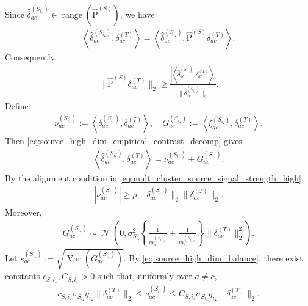 \documentclass[10pt]{article}
\newcommand{\wh}{\widehat}
\DeclareMathOperator{\dnorm}{\mathcal N}
\newcommand{\trg}{T}
\newcommand{\src}{S}
\newcommand{\sigmaSm}[1]{\sigma_{\src_{#1}}}
\newcommand{\Pest}{\wh{\mathrm P}}
\begin{document}
Since $\widehat\delta_{ac}^{(\src_{i_\star})}\in\operatorname{range}(\Pest^{(\src)})$, we have
\begin{align}
    \left\langle\widehat\delta_{ac}^{(\src_{i_\star})},\delta_{ac}^{(\trg)}\right\rangle=\left\langle\widehat\delta_{ac}^{(\src_{i_\star})},\Pest^{(\src)}\delta_{ac}^{(\trg)}\right\rangle.
\end{align}
Consequently,
\begin{align}
\label{eq:source_high_dim_projection_lower_bound_raw}
    \|\Pest^{(\src)}\delta_{ac}^{(\trg)}\|_2\ge \frac{\left|\left\langle\widehat\delta_{ac}^{(\src_{i_\star})},\delta_{ac}^{(\trg)}\right\rangle\right|}{\|\widehat\delta_{ac}^{(\src_{i_\star})}\|_2}.
\end{align}
Define
\begin{align}
\label{eq:source_high_dim_scalar_defs}
    \nu_{ac}^{(\src_{i_\star})}:=\left\langle\delta_{ac}^{(\src_{i_\star})},\delta_{ac}^{(\trg)}\right\rangle, \quad G_{ac}^{(\src_{i_\star})}:=\left\langle\xi_{ac}^{(\src_{i_\star})},\delta_{ac}^{(\trg)}\right\rangle.
\end{align}
Then \eqref{eq:source_high_dim_empirical_contrast_decomp} gives
\begin{align}
\label{eq:source_high_dim_inner_product_decomp}
    \left\langle\widehat\delta_{ac}^{(\src_{i_\star})},\delta_{ac}^{(\trg)}\right\rangle=\nu_{ac}^{(\src_{i_\star})}+G_{ac}^{(\src_{i_\star})}.
\end{align}
By the alignment condition in \eqref{eq:mult_cluster_source_signal_strength_high},
\begin{align}
\label{eq:source_high_dim_pairwise_alignment}
    |\nu_{ac}^{(\src_{i_\star})}|\ge \mu\|\delta_{ac}^{(\src_{i_\star})}\|_2\|\delta_{ac}^{(\trg)}\|_2.
\end{align}
Moreover,
\begin{align}
\label{eq:source_high_dim_scalar_noise_dist}
    G_{ac}^{(\src_{i_\star})}\sim\dnorm\left(0,\sigmaSm{i_\star}^2\left\{\frac{1}{m_a^{(\src_{i_\star})}}+\frac{1}{m_c^{(\src_{i_\star})}}\right\}\|\delta_{ac}^{(\trg)}\|_2^2\right).
\end{align}
Let $s_{ac}^{(\src_{i_\star})}:=\sqrt{\operatorname{Var}(G_{ac}^{(\src_{i_\star})})}$. By \eqref{eq:source_high_dim_balance}, there exist constants $c_{\src,i_\star},C_{\src,i_\star}>0$ such that, uniformly over $a\neq c$,
\begin{align}
\label{eq:source_high_dim_scalar_noise_sd}
    c_{\src,i_\star}\sigmaSm{i_\star}q_{i_\star}\|\delta_{ac}^{(\trg)}\|_2\le s_{ac}^{(\src_{i_\star})}\le C_{\src,i_\star}\sigmaSm{i_\star}q_{i_\star}\|\delta_{ac}^{(\trg)}\|_2.
\end{align}
\end{document}
